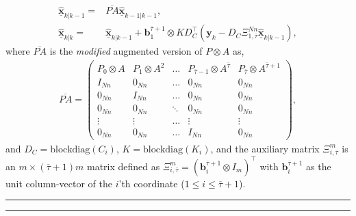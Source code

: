 \documentclass[journal]{IEEEtran}
\def\mb{\mathbf}
\begin{document}
\begin{align}\label{eq_p_aug}
	\underline{\widehat{\mb{x}}}_{k|k-1} =&\overline{PA} \underline{\widehat{\mb{x}}}_{k-1|k-1},
	\\\label{eq_m_aug}
	\underline{\widehat{\mb{x}}}_{k|k} =&  \underline{\widehat{\mb{x}}}_{k|k-1} + \mb{b}^{\overline{\tau}+1}_1 \otimes K D_C^\top \left(\mb{y}_k-D_C\Xi^{Nn}_{1,\overline{\tau}}\underline{\widehat{\mb{x}}}_{k|k-1}\right),
\end{align}
where 
$\overline{PA}$ is the \textit{modified} augmented version of $P \otimes A$ as,
\small \begin{align} \label{eq_aug_WA}
	\overline{PA}= \left( 
	\begin{array}{cccccc}
		P_0 \otimes A & P_1\otimes A^2  &  \hdots & P_{\overline{\tau}-1}\otimes A^{\overline{\tau}}  & P_{\overline{\tau}} \otimes A^{\overline{\tau}+1}  \\
		I_{Nn} &   0_{Nn}  &\hdots  & 0_{Nn}& 0_{Nn}\\
		0_{Nn} & I_{Nn} &   \hdots  & 0_{Nn} & 0_{Nn}  \\
		0_{Nn} &  0_{Nn} &  \ddots  & 0_{Nn} & 0_{Nn}  \\
		\vdots & \vdots &  \hdots & \vdots & \vdots \\
		0_{Nn} & 0_{Nn} &  \hdots & I_{Nn} & 0_{Nn}
	\end{array}	
	\right),
\end{align} \normalsize
and
${D}_C=\mbox{blockdiag}(C_i)$, $K = \mbox{blockdiag}(K_i)$, and the  auxiliary matrix $\Xi^m_{i,\overline{\tau}}$ is an $m \times (\overline{\tau}+1)m $ matrix defined as
$\Xi^m_{i,\overline{\tau}}= (\mb{b}^{\overline{\tau}+1}_i \otimes I_m)^\top $
with $\mb{b}^{\overline{\tau}+1}_i$ as the unit column-vector of the $i$'th coordinate ($1\leq i \leq {\overline{\tau}+1}$). 
\vspace{\belowdisplayskip}
\par\noindent\rule{\dimexpr(0.5\columnsep-0.4pt)}{0.4pt}%
\rule{0.4pt}{6pt}
\end{document}

